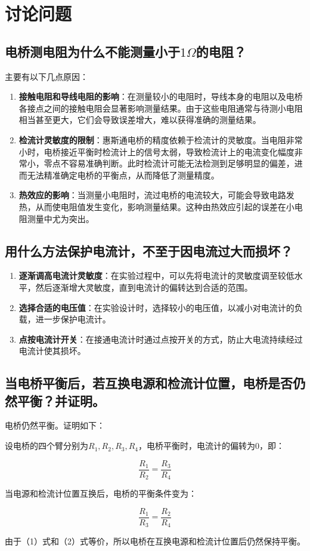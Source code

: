 \documentclass{ctexart}
\begin{document}
\section{讨论问题}

\subsection{电桥测电阻为什么不能测量小于$1\Omega$的电阻？}

主要有以下几点原因：

\begin{enumerate}
    \item \textbf{接触电阻和导线电阻的影响}：在测量较小的电阻时，导线本身的电阻以及电桥各接点之间的接触电阻会显著影响测量结果。由于这些电阻通常与待测小电阻相当甚至更大，它们会导致误差增大，难以获得准确的测量结果。
    \item \textbf{检流计灵敏度的限制}：惠斯通电桥的精度依赖于检流计的灵敏度。当电阻非常小时，电桥接近平衡时检流计上的信号太弱，导致检流计上的电流变化幅度非常小，零点不容易准确判断。此时检流计可能无法检测到足够明显的偏差，进而无法精准确定电桥的平衡点，从而降低了测量精度。
    \item \textbf{热效应的影响}：当测量小电阻时，流过电桥的电流较大，可能会导致电路发热，从而使电阻值发生变化，影响测量结果。这种由热效应引起的误差在小电阻测量中尤为突出。
\end{enumerate}

\subsection{用什么方法保护电流计，不至于因电流过大而损坏？}

\begin{enumerate}
    \item \textbf{逐渐调高电流计灵敏度}：在实验过程中，可以先将电流计的灵敏度调至较低水平，然后逐渐增大灵敏度，直到电流计的偏转达到合适的范围。
    \item \textbf{选择合适的电压值}：在实验设计时，选择较小的电压值，以减小对电流计的负载，进一步保护电流计。
    \item \textbf{点按电流计开关}：在接通电流计时通过点按开关的方式，防止大电流持续经过电流计使其损坏。
\end{enumerate}

\subsection{当电桥平衡后，若互换电源和检流计位置，电桥是否仍然平衡？并证明。}

电桥仍然平衡。证明如下：

设电桥的四个臂分别为$R_1, R_2, R_3, R_4$，电桥平衡时，电流计的偏转为0，即：

\begin{equation}
    \frac{R_1}{R_2} = \frac{R_3}{R_4}
\end{equation}

当电源和检流计位置互换后，电桥的平衡条件变为：

\begin{equation}
    \frac{R_1}{R_3} = \frac{R_2}{R_4}
\end{equation}

由于（1）式和（2）式等价，所以电桥在互换电源和检流计位置后仍然保持平衡。
\end{document}
